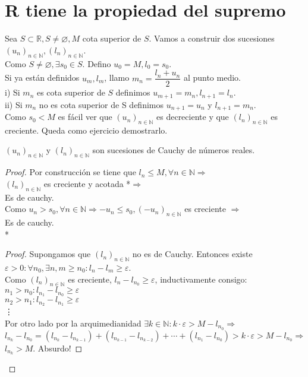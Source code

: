 \section{R tiene la propiedad del supremo}

Sea $S \subset \mathbb{R}, S \neq \varnothing, M$ cota superior de $S$. Vamos a construir dos sucesiones $(u_n)_{n \in \mathbb{N}}, (l_n)_{n \in \mathbb{N}}$. \\
Como $S \neq \varnothing, \exists s_0 \in S$. Defino $u_0 = M, l_0 = s_0$. \\
Si ya están definidos $u_m, l_m$, llamo $m_n = \dfrac{l_n+u_n}{2}$ al punto medio. \\
i) Si $m_n$ es cota superior de $S$ definimos $u_{m+1} = m_n, l_{n+1} = l_n$. \\
ii) Si $m_n$ no es cota superior de S definimos $u_{n+1} = u_n$ y $l_{n+1} = m_n$. \\
Como $s_0 < M$ es fácil ver que $(u_n)_{n \in \mathbb{N}}$ es decreciente y que $(l_n)_{n \in \mathbb{N}}$ es creciente. Queda como ejercicio demostrarlo.

\begin{lemma}
  $(u_n)_{n \in \mathbb{N}}$ y $(l_n)_{n \in \mathbb{N}}$ son sucesiones de Cauchy de números reales.
  \begin{proof}
    Por construcción se tiene que $l_n \leq M, \forall n \in \mathbb{N} \Rightarrow$ \\
    $(l_n)_{n \in \mathbb{N}}$ es creciente y acotada *$\Rightarrow$ \\
    Es de cauchy. \\

    Como $u_n > s_0, \forall n \in \mathbb{N} \Rightarrow -u_n \leq s_0, (-u_n)_{n \in \mathbb{N}}$ es creciente $\Rightarrow$ \\
    Es de cauchy. \\

    * \begin{proof}
      Supongamos que $(l_n)_{n \in \mathbb{N}}$ no es de Cauchy. Entonces existe $\varepsilon > 0 : \forall n_0, \exists n, m \geq n_0 : l_n - l_m \geq \varepsilon$. \\
      Como $(l_n)_{n \in \mathbb{N}}$ es creciente, $l_n - l_{n_0} \geq \varepsilon$, inductivamente consigo: \\
      $n_1 > n_0 : l_{n_1} - l_{n_0} \geq \varepsilon$ \\
      $n_2 > n_1 : l_{n_2} - l_{n_1} \geq \varepsilon$ \\
      \vdots \\

      Por otro lado por la arquimedianidad $\exists k \in \mathbb{N} : k \cdot \varepsilon > M - l_{n_0} \Rightarrow$ \\
      $l_{n_k} - l_{n_0} = (l_{n_k} - l_{n_{k-1}}) + (l_{n_{k-1}} - l_{n_{k-2}}) + \cdots + (l_{n_1} - l_{n_0}) > k \cdot \varepsilon > M - l_{n_0} \Rightarrow$ \\
      $l_{n_k} > M$. Absurdo!
    \end{proof}
  \end{proof}
\end{lemma}

